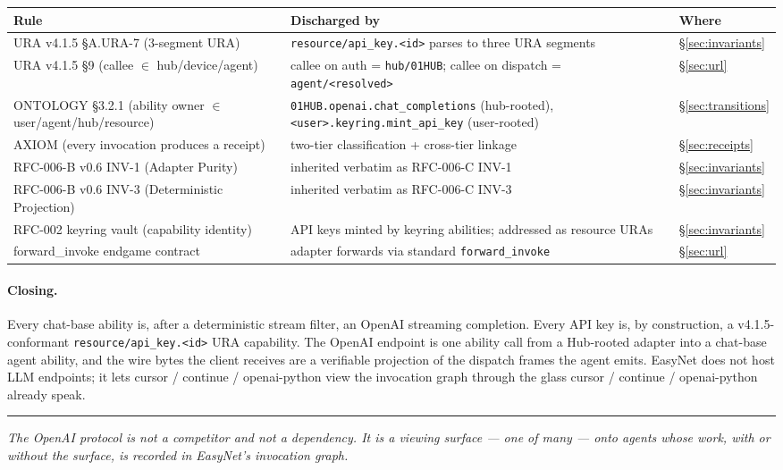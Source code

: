 \documentclass[11pt,a4paper]{article}
\theoremstyle{definition}
\begin{document}
\begin{center}
\renewcommand{\arraystretch}{1.18}
\begin{tabularx}{\linewidth}{l X l}
\toprule
\textbf{Rule} & \textbf{Discharged by} & \textbf{Where} \\
\midrule
URA v4.1.5 §A.URA-7 (3-segment URA)        & \texttt{resource/api\_key.<id>} parses to three URA segments  & \S\ref{sec:invariants} \\
URA v4.1.5 §9 (callee \(\in\) hub/device/agent) & callee on auth = \texttt{hub/01HUB}; callee on dispatch = \texttt{agent/<resolved>}     & \S\ref{sec:url} \\
ONTOLOGY §3.2.1 (ability owner \(\in\) user/agent/hub/resource) & \texttt{01HUB.openai.chat\_completions} (hub-rooted), \texttt{<user>.keyring.mint\_api\_key} (user-rooted)         & \S\ref{sec:transitions} \\
AXIOM (every invocation produces a receipt) & two-tier classification + cross-tier linkage                       & \S\ref{sec:receipts} \\
RFC-006-B v0.6 INV-1 (Adapter Purity)       & inherited verbatim as RFC-006-C INV-1                               & \S\ref{sec:invariants} \\
RFC-006-B v0.6 INV-3 (Deterministic Projection) & inherited verbatim as RFC-006-C INV-3                            & \S\ref{sec:invariants} \\
RFC-002 keyring vault (capability identity) & API keys minted by keyring abilities; addressed as resource URAs    & \S\ref{sec:invariants} \\
forward\_invoke endgame contract            & adapter forwards via standard \texttt{forward\_invoke}              & \S\ref{sec:url} \\
\bottomrule
\end{tabularx}
\end{center}

\paragraph{Closing.} Every chat-base ability is, after a
deterministic stream filter, an OpenAI streaming completion.
Every API key is, by construction, a v4.1.5-conformant
\texttt{resource/api\_key.<id>} URA capability. The OpenAI
endpoint is one ability call from a Hub-rooted adapter into a
chat-base agent ability, and the wire bytes the client receives
are a verifiable projection of the dispatch frames the agent
emits. EasyNet does not host LLM endpoints; it lets cursor /
continue / openai-python view the invocation graph through the
glass cursor / continue / openai-python already speak.

\vfill
\hrule
\vspace{0.4em}
\noindent\small
\textit{The OpenAI protocol is not a competitor and not a
dependency. It is a viewing surface --- one of many --- onto
agents whose work, with or without the surface, is recorded
in EasyNet's invocation graph.}
\end{document}
